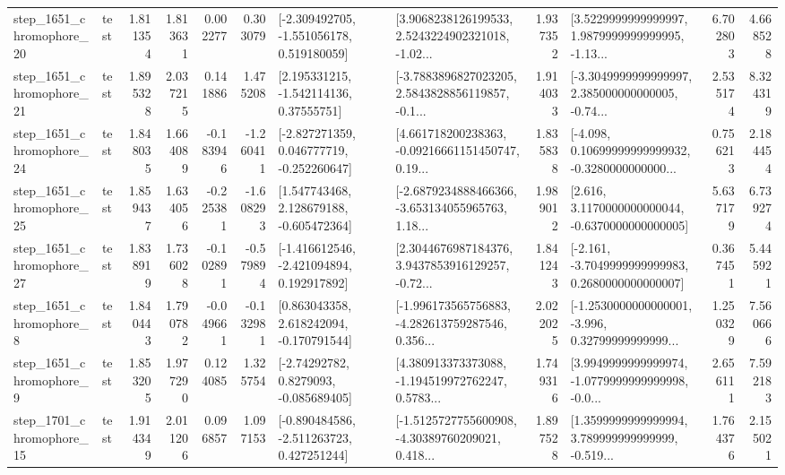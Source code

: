 \begin{tabular}{llrrrrllrlrr}
 step\_1651\_chromophore\_20 &      test &      1.811354 &    1.813631 &      0.002277 &  0.303079 &   [-2.309492705, -1.551056178, 0.519180059] &  [3.9068238126199533, 2.5243224902321018, -1.02... &       1.937352 &  [3.5229999999999997, 1.9879999999999995, -1.13... &            6.702803 &          4.668528 \\
 step\_1651\_chromophore\_21 &      test &      1.895328 &    2.037215 &      0.141886 &  1.475208 &     [2.195331215, -1.542114136, 0.37555751] &  [-3.7883896827023205, 2.5843828856119857, -0.1... &       1.914033 &  [-3.3049999999999997, 2.385000000000005, -0.74... &            2.535174 &          8.324319 \\
 step\_1651\_chromophore\_24 &      test &      1.848035 &    1.664089 &     -0.183946 & -1.260411 &   [-2.827271359, 0.046777719, -0.252260647] &  [4.661718200238363, -0.09216661151450747, 0.19... &       1.835838 &  [-4.098, 0.10699999999999932, -0.3280000000000... &            0.756213 &          2.184454 \\
 step\_1651\_chromophore\_25 &      test &      1.859437 &    1.634056 &     -0.225381 & -1.608293 &    [1.547743468, 2.128679188, -0.605472364] &  [-2.6879234888466366, -3.653134055965763, 1.18... &       1.989012 &   [2.616, 3.1170000000000044, -0.6370000000000005] &            5.637179 &          6.739274 \\
 step\_1651\_chromophore\_27 &      test &      1.838919 &    1.736028 &     -0.102891 & -0.579894 &   [-1.416612546, -2.421094894, 0.192917892] &  [2.3044676987184376, 3.9437853916129257, -0.72... &       1.841243 &  [-2.161, -3.7049999999999983, 0.2680000000000007] &            0.367451 &          5.445921 \\
  step\_1651\_chromophore\_8 &      test &      1.840443 &    1.790782 &     -0.049661 & -0.132981 &    [0.863043358, 2.618242094, -0.170791544] &  [-1.996173565756883, -4.282613759287546, 0.356... &       2.022025 &  [-1.2530000000000001, -3.996, 0.32799999999999... &            1.250329 &          7.560666 \\
  step\_1651\_chromophore\_9 &      test &      1.853205 &    1.977290 &      0.124085 &  1.325754 &      [-2.74292782, 0.8279093, -0.085689405] &  [4.380913373373088, -1.194519972762247, 0.5783... &       1.749316 &  [3.9949999999999974, -1.0779999999999998, -0.0... &            2.656111 &          7.592183 \\
 step\_1701\_chromophore\_15 &      test &      1.914349 &    2.011206 &      0.096857 &  1.097153 &   [-0.890484586, -2.511263723, 0.427251244] &  [-1.5125727755600908, -4.30389760209021, 0.418... &       1.897528 &  [1.3599999999999994, 3.789999999999999, -0.519... &            1.764376 &          2.155021 \\

\end{tabular}
